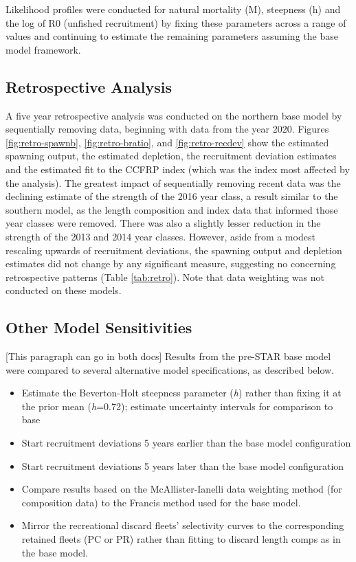 \documentclass[
  english,
  a4paper,
]{article}
\providecommand{\tightlist}{%
  \setlength{\itemsep}{0pt}\setlength{\parskip}{0pt}}
\begin{document}
Likelihood profiles were conducted for natural mortality (M), steepness (h) and the log of R0 (unfished recruitment) by fixing these parameters across a range of values and continuing to estimate the remaining parameters assuming the base model framework.

\hypertarget{retrospective-analysis}{%
\subsection{Retrospective Analysis}\label{retrospective-analysis}}

A five year retrospective analysis was conducted on the northern base model by sequentially removing data, beginning with data from the year 2020. Figures \ref{fig:retro-spawnb}, \ref{fig:retro-bratio}, and \ref{fig:retro-recdev} show the estimated spawning output, the estimated depletion, the recruitment deviation estimates and the estimated fit to the CCFRP index (which was the index most affected by the analysis). The greatest impact of sequentially removing recent data was the declining estimate of the strength of the 2016 year class, a result similar to the southern model, as the length composition and index data that informed those year classes were removed. There was also a slightly lesser reduction in the strength of the 2013 and 2014 year classes. However, aside from a modest rescaling upwards of recruitment deviations, the spawning output and depletion estimates did not change by any significant measure, suggesting no concerning retrospective patterns (Table \ref{tab:retro}). Note that data weighting was not conducted on these models.

\hypertarget{other-model-sensitivities}{%
\subsection{Other Model Sensitivities}\label{other-model-sensitivities}}

{[}This paragraph can go in both docs{]}
Results from the pre-STAR base model were compared to several alternative model specifications, as described below.

\begin{itemize}
\tightlist
\item
  Estimate the Beverton-Holt steepness parameter (\emph{h}) rather than fixing it at the prior mean (\emph{h}=0.72); estimate uncertainty intervals for comparison to base
\item
  Start recruitment deviations 5 years earlier than the base model configuration
\item
  Start recruitment deviations 5 years later than the base model configuration
\item
  Compare results based on the McAllister-Ianelli data weighting method (for composition data) to the Francis method used for the base model.
\item
  Mirror the recreational discard fleets' selectivity curves to the corresponding retained fleets (PC or PR) rather than fitting to discard length comps as in the base model.
\end{itemize}
\end{document}

